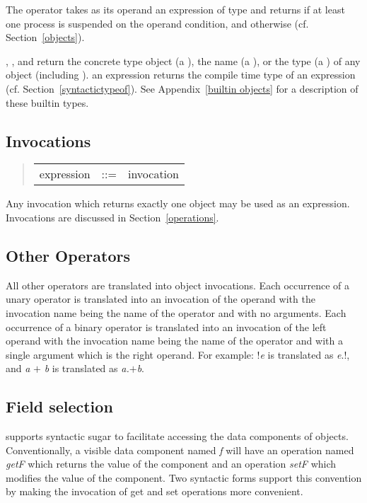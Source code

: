The  operator takes as its operand an expression of
type  and returns  if at least one process
is suspended on the operand condition, and
 otherwise (cf. Section~\ref{objects}).

, , and  
\label{operator typeof}
return the concrete type object (a ), the name (a ), or
the type (a ) of any object (including ).
 an expression returns the compile time type of an
expression (cf. Section~\ref{syntactictypeof}).  See
Appendix~\ref{builtin objects}
for a description of these builtin types.

\subsection{Invocations}
\begin{quote}\it\begin{tabular}{lcl}
expression & ::= & invocation
\end{tabular}\end{quote}
Any invocation which returns exactly one object may be used as an
expression.  Invocations are discussed in Section~\ref{operations}.

\subsection{Other Operators}
All other operators are translated into object invocations.  Each occurrence
of a unary operator is 
translated into an invocation of the operand with the invocation name being
the name of the operator and with no arguments.  Each occurrence of a binary
operator is translated into an invocation of the left operand with the
invocation name being the name of the operator and with a single argument
which is the right operand.  For example: {$!${\it e}} is translated as {{\it
e\/}.$!$}, and {{\it a\/} $+$ {\it b\/}} is translated as {{\it {\it a\/}.$+$\LB{}b\/}\RB}.


\subsection{Field selection}
\emd{} supports syntactic sugar to facilitate accessing the data components
of objects.  Conventionally, a visible data component named {\it f}
will have an operation named {\it getF} which returns the value of the
component and an operation {\it setF} which modifies the value of the
component.  Two syntactic forms support this convention by making the
invocation of get and set operations more convenient.

